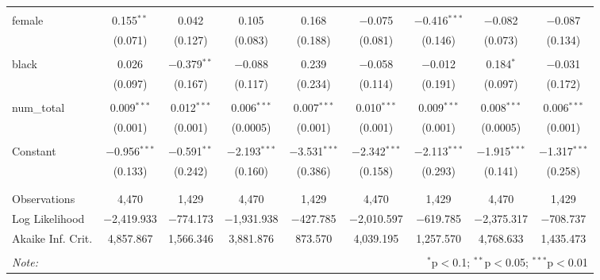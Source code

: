 \begin{table}[!htbp]
\begin{tabular}{@{\extracolsep{5pt}}lcccccccc}
  & & & & & & & & \\ 
 female & 0.155$^{**}$ & 0.042 & 0.105 & 0.168 & $-$0.075 & $-$0.416$^{***}$ & $-$0.082 & $-$0.087 \\ 
  & (0.071) & (0.127) & (0.083) & (0.188) & (0.081) & (0.146) & (0.073) & (0.134) \\ 
  & & & & & & & & \\ 
 black & 0.026 & $-$0.379$^{**}$ & $-$0.088 & 0.239 & $-$0.058 & $-$0.012 & 0.184$^{*}$ & $-$0.031 \\ 
  & (0.097) & (0.167) & (0.117) & (0.234) & (0.114) & (0.191) & (0.097) & (0.172) \\ 
  & & & & & & & & \\ 
 num\_total & 0.009$^{***}$ & 0.012$^{***}$ & 0.006$^{***}$ & 0.007$^{***}$ & 0.010$^{***}$ & 0.009$^{***}$ & 0.008$^{***}$ & 0.006$^{***}$ \\ 
  & (0.001) & (0.001) & (0.0005) & (0.001) & (0.001) & (0.001) & (0.0005) & (0.001) \\ 
  & & & & & & & & \\ 
 Constant & $-$0.956$^{***}$ & $-$0.591$^{**}$ & $-$2.193$^{***}$ & $-$3.531$^{***}$ & $-$2.342$^{***}$ & $-$2.113$^{***}$ & $-$1.915$^{***}$ & $-$1.317$^{***}$ \\ 
  & (0.133) & (0.242) & (0.160) & (0.386) & (0.158) & (0.293) & (0.141) & (0.258) \\ 
  & & & & & & & & \\ 
\hline \\[-1.8ex] 
Observations & 4,470 & 1,429 & 4,470 & 1,429 & 4,470 & 1,429 & 4,470 & 1,429 \\ 
Log Likelihood & $-$2,419.933 & $-$774.173 & $-$1,931.938 & $-$427.785 & $-$2,010.597 & $-$619.785 & $-$2,375.317 & $-$708.737 \\ 
Akaike Inf. Crit. & 4,857.867 & 1,566.346 & 3,881.876 & 873.570 & 4,039.195 & 1,257.570 & 4,768.633 & 1,435.473 \\ 
\hline 
\hline \\[-1.8ex] 
\textit{Note:}  & \multicolumn{8}{r}{$^{*}$p$<$0.1; $^{**}$p$<$0.05; $^{***}$p$<$0.01} \\ 
\end{tabular} 
\end{table} 
